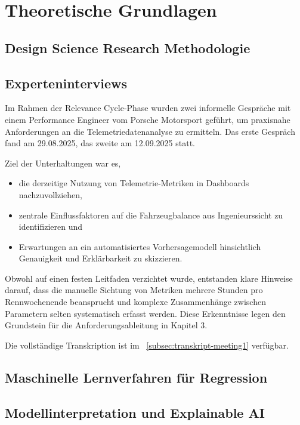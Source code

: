 \chapter{Theoretische Grundlagen}
\section{Design Science Research Methodologie}
\section{Experteninterviews}

Im Rahmen der Relevance Cycle-Phase wurden zwei informelle Gespräche mit einem Performance Engineer vom Porsche Motorsport geführt, um praxisnahe Anforderungen an die Telemetriedatenanalyse zu ermitteln. Das erste Gespräch fand am 29.08.2025, das zweite am 12.09.2025 statt.

Ziel der Unterhaltungen war es,  
\begin{itemize}
  \item die derzeitige Nutzung von Telemetrie-Metriken in Dashboards nachzuvollziehen,  
  \item zentrale Einflussfaktoren auf die Fahrzeugbalance aus Ingenieurssicht zu identifizieren und  
  \item Erwartungen an ein automatisiertes Vorhersagemodell hinsichtlich Genauigkeit und Erklärbarkeit zu skizzieren.  
\end{itemize}

Obwohl auf einen festen Leitfaden verzichtet wurde, entstanden klare Hinweise darauf, dass die manuelle Sichtung von Metriken mehrere Stunden pro Rennwochenende beansprucht und komplexe Zusammenhänge zwischen Parametern selten systematisch erfasst werden. Diese Erkenntnisse legen den Grundstein für die Anforderungsableitung in Kapitel 3.  


Die vollständige Transkription ist im ~\ref{subsec:transkript-meeting1} verfügbar.




\section{Maschinelle Lernverfahren für Regression}
\section{Modellinterpretation und Explainable AI}